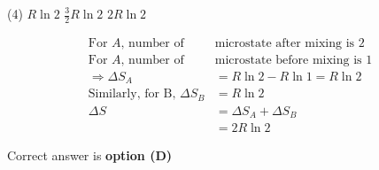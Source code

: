 \begin{enumerate}
\begin{tasks}(4)
\task[\textbf{B.}] $R \ln 2$  
\task[\textbf{C.}] $\frac{3}{2} R \ln 2$
\task[\textbf{D.}]  $2 R \ln 2$
\end{tasks}
\begin{answer}
	$$\begin{aligned}
	\text{For $A$, number of }&\text{microstate after mixing is 2}\\
	\text{For $A$, number of }&\text{microstate before mixing is 1}\\
	\Rightarrow \Delta S_{A}&=R \ln 2-R \ln 1=R \ln 2\\
	\text{Similarly, for B, } \Delta S_{B}&=R \ln 2 \\ \Delta S&=\Delta S_{A}+\Delta S_{B}\\&=2 R \ln 2
	\end{aligned}$$

Correct answer is \textbf{option (D)}
\end{answer}
\end{enumerate}